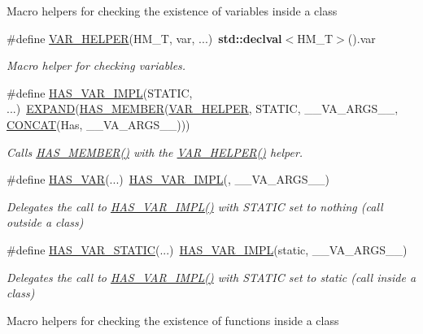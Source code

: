Macro helpers for checking the existence of variables inside a class \begin{DoxyCompactItemize}
\item 
\#define \hyperlink{group__HasMemberGroup_ga7987e8af19ede1038fc3063be814fbc3}{V\+A\+R\+\_\+\+H\+E\+L\+P\+ER}(H\+M\+\_\+T,  var, ...)~{\bf std\+::declval}$<$H\+M\+\_\+T$>$().var
\begin{DoxyCompactList}\small\item\em Macro helper for checking variables. \end{DoxyCompactList}\item 
\#define \hyperlink{group__HasMemberGroup_ga2c4d77913b98bd922254de0742b294e0}{H\+A\+S\+\_\+\+V\+A\+R\+\_\+\+I\+M\+PL}(S\+T\+A\+T\+IC, ...)~\hyperlink{ZipIter_2Helpers_8h_aa35fecfa6a93ec3fdb4a3776f873be27}{E\+X\+P\+A\+ND}(\hyperlink{group__HasMemberGroup_ga37993e5e75a0249077679e4776e89085}{H\+A\+S\+\_\+\+M\+E\+M\+B\+ER}(\hyperlink{group__HasMemberGroup_ga7987e8af19ede1038fc3063be814fbc3}{V\+A\+R\+\_\+\+H\+E\+L\+P\+ER}, S\+T\+A\+T\+IC, \+\_\+\+\_\+\+V\+A\+\_\+\+A\+R\+G\+S\+\_\+\+\_\+, \hyperlink{ZipIter_2Helpers_8h_a2f18db18bca26cafa95e9719de4a41ef}{C\+O\+N\+C\+AT}(Has, \+\_\+\+\_\+\+V\+A\+\_\+\+A\+R\+G\+S\+\_\+\+\_\+)))
\begin{DoxyCompactList}\small\item\em Calls \hyperlink{group__HasMemberGroup_ga37993e5e75a0249077679e4776e89085}{H\+A\+S\+\_\+\+M\+E\+M\+B\+E\+R()} with the \hyperlink{group__HasMemberGroup_ga7987e8af19ede1038fc3063be814fbc3}{V\+A\+R\+\_\+\+H\+E\+L\+P\+E\+R()} helper. \end{DoxyCompactList}\item 
\#define \hyperlink{group__HasMemberGroup_ga9506a65ecb7c2a37bcabb2e2d371d42e}{H\+A\+S\+\_\+\+V\+AR}(...)~\hyperlink{group__HasMemberGroup_ga2c4d77913b98bd922254de0742b294e0}{H\+A\+S\+\_\+\+V\+A\+R\+\_\+\+I\+M\+PL}(, \+\_\+\+\_\+\+V\+A\+\_\+\+A\+R\+G\+S\+\_\+\+\_\+)
\begin{DoxyCompactList}\small\item\em Delegates the call to \hyperlink{group__HasMemberGroup_ga2c4d77913b98bd922254de0742b294e0}{H\+A\+S\+\_\+\+V\+A\+R\+\_\+\+I\+M\+P\+L()} with {\ttfamily S\+T\+A\+T\+IC} set to nothing (call outside a class) \end{DoxyCompactList}\item 
\#define \hyperlink{group__HasMemberGroup_ga0746b1606f5166046971f5bab05cb8fc}{H\+A\+S\+\_\+\+V\+A\+R\+\_\+\+S\+T\+A\+T\+IC}(...)~\hyperlink{group__HasMemberGroup_ga2c4d77913b98bd922254de0742b294e0}{H\+A\+S\+\_\+\+V\+A\+R\+\_\+\+I\+M\+PL}(static, \+\_\+\+\_\+\+V\+A\+\_\+\+A\+R\+G\+S\+\_\+\+\_\+)
\begin{DoxyCompactList}\small\item\em Delegates the call to \hyperlink{group__HasMemberGroup_ga2c4d77913b98bd922254de0742b294e0}{H\+A\+S\+\_\+\+V\+A\+R\+\_\+\+I\+M\+P\+L()} with {\ttfamily S\+T\+A\+T\+IC} set to {\ttfamily static} (call inside a class) \end{DoxyCompactList}\end{DoxyCompactItemize}
\label{_amgrp01747264fe7bf50731df0522c351974e}%
Macro helpers for checking the existence of functions inside a class

